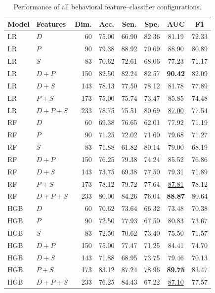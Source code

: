 \documentclass[conference,a4paper]{IEEEtran}
\begin{document}
\begin{table}[t]
\caption{Performance of all behavioral feature--classifier configurations.}
\label{tab:ml_results}
\centering
\footnotesize
\setlength{\tabcolsep}{4.2pt}
\begin{tabular}{llrccccc}
\toprule
Model & Features & Dim. & Acc. & Sen. & Spe. & AUC & F1 \\
\midrule
LR & $D$ & 60 & 75.00 & 66.90 & 82.36 & 81.19 & 72.33 \\
LR & $P$ & 90 & 79.38 & 88.92 & 70.69 & 88.90 & 80.89 \\
LR & $S$ & 83 & 70.62 & 72.61 & 68.06 & 77.23 & 71.17 \\
LR & $D+P$ & 150 & 82.50 & 82.24 & 82.57 & \textbf{90.42} & 82.09 \\
LR & $D+S$ & 143 & 78.13 & 77.50 & 78.12 & 81.78 & 77.89 \\
LR & $P+S$ & 173 & 75.00 & 75.74 & 73.47 & 85.85 & 74.48 \\
LR & $D+P+S$ & 233 & 78.75 & 75.51 & 80.69 & \underline{87.00} & 77.54 \\
\midrule
RF & $D$ & 60 & 69.38 & 76.65 & 62.01 & 77.92 & 71.19 \\
RF & $P$ & 90 & 71.25 & 72.02 & 71.60 & 79.68 & 71.27 \\
RF & $S$ & 83 & 71.88 & 61.82 & 80.14 & 79.00 & 68.19 \\
RF & $D+P$ & 150 & 76.25 & 79.38 & 74.24 & 85.52 & 76.86 \\
RF & $D+S$ & 143 & 73.75 & 69.38 & 77.50 & 79.31 & 71.89 \\
RF & $P+S$ & 173 & 78.12 & 79.72 & 77.64 & \underline{87.81} & 78.12 \\
RF & $D+P+S$ & 233 & 80.00 & 84.26 & 76.04 & \textbf{88.87} & 80.64 \\
\midrule
HGB & $D$ & 60 & 70.62 & 73.64 & 66.32 & 73.48 & 70.38 \\
HGB & $P$ & 90 & 72.50 & 77.93 & 67.50 & 80.83 & 73.67 \\
HGB & $S$ & 83 & 72.50 & 70.62 & 73.40 & 75.50 & 71.57 \\
HGB & $D+P$ & 150 & 75.00 & 77.47 & 71.25 & 84.41 & 74.70 \\
HGB & $D+S$ & 143 & 71.88 & 68.95 & 73.75 & 79.46 & 70.13 \\
HGB & $P+S$ & 173 & 83.12 & 87.24 & 78.96 & \textbf{89.75} & 83.47 \\
HGB & $D+P+S$ & 233 & 76.25 & 84.43 & 67.22 & \underline{87.10} & 77.57 \\
\bottomrule
\end{tabular}
\end{table}
\end{document}

